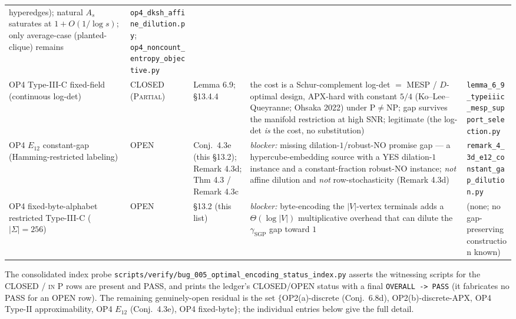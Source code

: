 \documentclass[
]{article}
\begin{document}
\begin{tabular}{@{}p{2.7cm}p{1.5cm}p{2.6cm}p{3.3cm}p{3.0cm}@{}}
hyperedges); natural $A_s$ saturates at $1+O(1/\log s)$; only
average-case (planted-clique) remains
& \texttt{op4\_dksh\_affine\_dilution.py};
\texttt{op4\_noncount\_entropy\_objective.py}\\
OP4 Type-III-C fixed-field (continuous log-det)
& CLOSED (\textsc{Partial})
& Lemma 6.9; §13.4.4
& the cost is a Schur-complement log-det $=$ MESP / $D$-optimal design,
APX-hard with constant $5/4$ (Ko--Lee--Queyranne; Ohsaka 2022) under
$\mathrm P\neq\mathrm{NP}$; gap survives the manifold restriction at
high SNR; legitimate (the log-det \emph{is} the cost, no substitution)
& \texttt{lemma\_6\_9\_typeiiic\_mesp\_support\_selection.py}\\
OP4 $E_{12}$ constant-gap (Hamming-restricted labeling)
& OPEN
& Conj.\ 4.3e (this §13.2); Remark 4.3d; Thm 4.3 / Remark 4.3c
& \emph{blocker:} missing dilation-$1$/robust-NO promise gap --- a
hypercube-embedding source with a YES dilation-$1$ instance and a
constant-fraction robust-NO instance; \emph{not} affine dilution and
\emph{not} row-stochasticity (Remark 4.3d)
& \texttt{remark\_4\_3d\_e12\_constant\_gap\_dilution.py}\\
OP4 fixed-byte-alphabet restricted Type-III-C ($|\Sigma|=256$)
& OPEN
& §13.2 (this list)
& \emph{blocker:} byte-encoding the $|V|$-vertex terminals adds a
$\Theta(\log|V|)$ multiplicative overhead that can dilute the
$\gamma_{\mathrm{SGP}}$ gap toward $1$
& (none; no gap-preserving construction known)\\
\hline
\end{tabular}
\par\endgroup

\noindent The consolidated index probe
\texttt{scripts/verify/bug\_005\_optimal\_encoding\_status\_index.py}
asserts the witnessing scripts for the CLOSED / \textsc{in P} rows are
present and PASS, and prints the ledger's CLOSED/OPEN status with a final
\texttt{OVERALL -> PASS} (it fabricates no PASS for an OPEN row). The
remaining genuinely-open residual is the set
$\{$OP2(a)-discrete (Conj.\ 6.8d), OP2(b)-discrete-APX, OP4 Type-II
approximability, OP4 $E_{12}$ (Conj.\ 4.3e), OP4 fixed-byte$\}$; the
individual entries below give the full detail.
\end{document}
